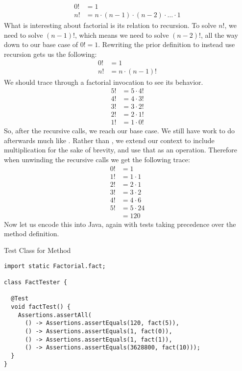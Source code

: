 \begin{align*}
    0! &= 1\\
    n! &= n \cdot (n - 1) \cdot (n - 2) \cdot \ldots \cdot 1
\end{align*}
What is interesting about factorial is its relation to recursion. To solve $n!$, we need to solve $(n-1)!$, which means we need to solve $(n-2)!$, all the way down to our base case of $0!=1$. Rewriting the prior definition to instead use recursion gets us the following: 
\begin{align*}
    0! &= 1\\
    n! &= n \cdot (n - 1)!
\end{align*}
We should trace through a factorial invocation to see its behavior.
\begin{align*}
    5! &= 5 \cdot 4!\\
    4! &= 4 \cdot 3!\\
    3! &= 3 \cdot 2!\\
    2! &= 2 \cdot 1!\\
    1! &= 1 \cdot 0!
\end{align*}
So, after the recursive calls, we reach our base case. We still have work to do afterwards much like . Rather than , we extend our context to include multiplication for the sake of brevity, and use that as an operation. Therefore when unwinding the recursive calls we get the following trace:
\begin{align*}
0! &= 1\\
1! &= 1 \cdot 1\\
2! &= 2 \cdot 1\\
3! &= 3 \cdot 2\\
4! &= 4 \cdot 6\\
5! &= 5 \cdot 24\\
   &= 120
\end{align*}
Now let us encode this into Java, again with tests taking precedence over the method definition.
\begin{cl}[]{Test Class for  Method}
\begin{lstlisting}[language=MyJava]
import static Factorial.fact;

class FactTester {
  
  @Test
  void factTest() {
    Assertions.assertAll(
      () -> Assertions.assertEquals(120, fact(5)),
      () -> Assertions.assertEquals(1, fact(0)),
      () -> Assertions.assertEquals(1, fact(1)),
      () -> Assertions.assertEquals(3628800, fact(10)));
  }
}
\end{lstlisting}
\end{cl}
